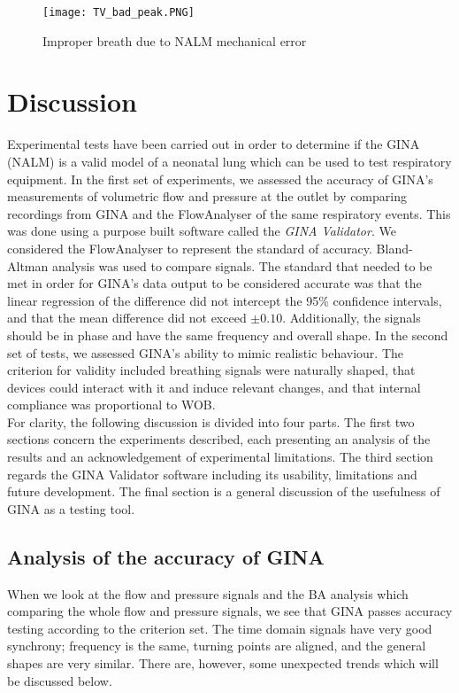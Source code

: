 \documentclass[12pt, openany, oneside]{book}
\begin{document}
\begin{figure}
	\centering
	\texttt{[image: TV\_bad\_peak.PNG]}		
	\caption{Improper breath due to NALM  mechanical error}
	\label{fig:nalmerror}

\end{figure}



\section{Discussion}

Experimental tests have been carried out in order to determine if the GINA (NALM) is a valid model of a neonatal lung which can be used to test respiratory equipment. In the first set of experiments, we assessed the accuracy of GINA's measurements of volumetric flow and pressure at the outlet by comparing recordings from GINA and the FlowAnalyser of the same respiratory events. This was done using a purpose built software called the \textit{GINA Validator}. We considered the FlowAnalyser to represent the standard of accuracy. Bland-Altman analysis was used to compare signals. The standard that needed to be met in order for GINA's data output to be considered accurate was that the linear regression of the difference did not intercept the 95{\%} confidence intervals, and that the mean difference did not exceed $\pm0.10$. Additionally, the signals should be in phase and have the same frequency and overall shape. In the second set of tests, we assessed GINA's ability to mimic realistic behaviour. The criterion for validity included breathing signals were naturally shaped, that devices could interact with it and induce relevant changes, and that internal compliance was proportional to WOB.\\

For clarity, the following discussion is divided into four parts. The first two sections concern the experiments described, each presenting an analysis of the results and an acknowledgement of experimental limitations. The third section regards the GINA Validator software including its usability, limitations and future development. The final section is a general discussion of the usefulness of GINA as a testing tool.\\

\subsection{Analysis of the accuracy of GINA}
When we look at the flow and pressure signals and the BA analysis which comparing the whole flow and pressure signals, we see that GINA passes accuracy testing according to the criterion set. The time domain signals have very good synchrony; frequency is the same, turning points are aligned, and the general shapes are very similar. There are, however, some unexpected trends which will be discussed below.\\
\end{document}
